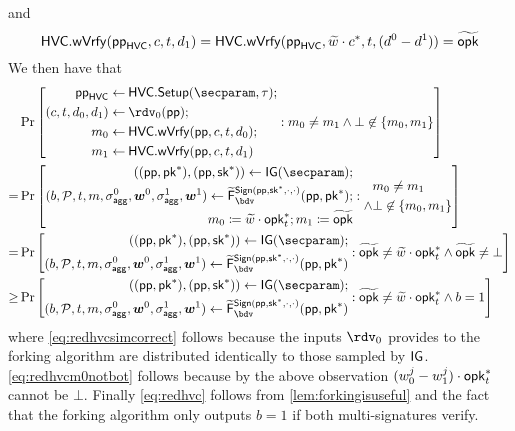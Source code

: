   and
  \[
    \mathsf{HVC}.\mathsf{wVrfy}(\mathsf{pp}_{\mathsf{HVC}},c,t,d_1) = \mathsf{HVC}.\mathsf{wVrfy}(\mathsf{pp}_{\mathsf{HVC}},\widetilde w\cdot c^*,t,(d^0-d^1)) = \widetilde{\mathsf{opk}}
  \]
  We then have that
    \begin{align}
    &\Pr\left[
      \begin{aligned}
      \hvcparams\gets&\mspace{\medmuskip}\hvc.\setup(\secparam,\tau);\\
      (c,t,d_0,d_1) \gets&\mspace{\medmuskip} \rdv_0(\params);\\
      m_0 \gets&\mspace{\medmuskip} \hvc.\wverify(\params,c,t,d_0);\\
      m_1 \gets&\mspace{\medmuskip} \hvc.\wverify(\params,c,t,d_1)
      \end{aligned}:
      m_0\neq m_1 \land\bot\not\in\{m_0,m_1\}
    \right]\notag\\
    =&\Pr\left[
      \begin{aligned}
      ((\params,\pk^*),(\params,\sk^*)) \gets \IG(\secparam);\\
      (b,\pubkeys,t,m,\aggsig^0,\vec{w}^0,\aggsig^1,\vec{w}^1)\gets \widetilde\fork^{\sign(\params,\sk^*,\cdot,\cdot)}_\bdv(\params,\pk^*);\\
      m_0 \coloneqq \widetilde w\cdot \opk^*_t;
      m_1 \coloneqq \widetilde\opk
      \end{aligned}:
      \begin{aligned}
      &m_0\neq m_1\\ \land&\bot\not\in\{m_0,m_1\}
      \end{aligned}
    \right]\label{eq:redhvcsimcorrect}\\
    =&\Pr\left[
      \begin{aligned}
      ((\params,\pk^*),(\params,\sk^*)) \gets \IG(\secparam);\\
      (b,\pubkeys,t,m,\aggsig^0,\vec{w}^0,\aggsig^1,\vec{w}^1)\gets \widetilde\fork^{\sign(\params,\sk^*,\cdot,\cdot)}_\bdv(\params,\pk^*)
      \end{aligned}:
      \widetilde\opk \neq \widetilde w\cdot \opk^*_t \land \widetilde\opk \neq \bot
    \right]\label{eq:redhvcm0notbot}\\
    \geq&\Pr\left[
      \begin{aligned}
      ((\params,\pk^*),(\params,\sk^*)) \gets \IG(\secparam);\\
      (b,\pubkeys,t,m,\aggsig^0,\vec{w}^0,\aggsig^1,\vec{w}^1)\gets \widetilde\fork^{\sign(\params,\sk^*,\cdot,\cdot)}_\bdv(\params,\pk^*)
      \end{aligned}:
      \widetilde\opk \neq \widetilde w\cdot \opk^*_t \land b=1
    \right]\label{eq:redhvc}
  \end{align}
  where \autoref{eq:redhvcsimcorrect} follows because the inputs $\rdv_0$ provides to the forking algorithm are distributed identically to those sampled by $\mathsf{IG}$.
  \autoref{eq:redhvcm0notbot} follows because by the above observation $(w^j_0-w^j_1)\cdot\mathsf{opk}^*_t$ cannot be $\bot$.
  Finally \autoref{eq:redhvc} follows from \autoref{lem:forkingisuseful} and the fact that the forking algorithm only outputs $b=1$ if both multi-signatures verify.
  
